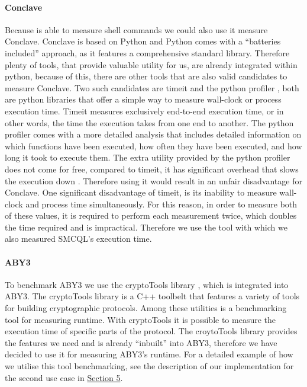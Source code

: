 \paragraph{Conclave}
Because  is able to measure shell commands we could also use it measure Conclave. Conclave is based on Python and Python comes with a ``batteries included'' approach, as it features a comprehensive standard library. Therefore plenty of tools, that provide valuable utility for us, are already integrated within python, because of this, there are other tools that are also valid candidates to measure Conclave. Two such candidates are timeit \cite{time} and the python profiler \cite{cProfile}, both are python libraries that offer a simple way to measure wall-clock or process execution time. Timeit measures exclusively end-to-end execution time, or in other words, the time the execution takes from one end to another. The python profiler comes with a more detailed analysis that includes detailed information on which functions have been executed, how often they have been executed, and how long it took to execute them. The extra utility provided by the python profiler does not come for free, compared to timeit, it has significant overhead that slows the execution down \cite{cProfile}. Therefore using it would result in an unfair disadvantage for Conclave. One significant disadvantage of timeit, is its inability to measure wall-clock and process time simultaneously. For this reason, in order to measure both of these values, it is required to perform each measurement twice, which doubles the time required and is impractical. Therefore we use the  tool with which we also measured SMCQL's execution time.  



\paragraph{ABY3}
 To benchmark ABY3 we use the cryptoTools library \cite{cryotoTools}, which is integrated into ABY3. The cryptoTools library is a C++ toolbelt that features a variety of tools for building cryptographic protocols. Among these utilities is a benchmarking tool for measuring runtime. With cryptoTools it is possible to measure the execution time of specific parts of the protocol. The croytoTools library provides the features we need and is already ``inbuilt'' into ABY3, therefore we have decided to use it for measuring ABY3's runtime. For a detailed example of how we utilise this tool benchmarking, see the description of our implementation for the second use case in \hyperref[Implementation]{Section 5}.





